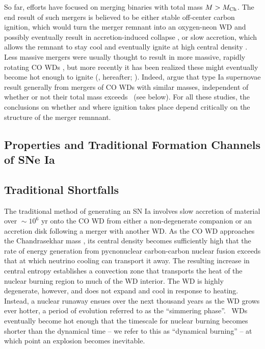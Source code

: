 So far, efforts have focused on merging binaries with total mass $M>\Mch$.  The end result of such mergers is believed to be either stable off-center carbon ignition, which would turn the merger remnant into an oxygen-neon WD and possibly eventually result in accretion-induced collapse \citep{saion98}, or slow accretion, which allows the remnant to stay cool and eventually ignite at high central density \citep{yoonpr07}.  Less massive mergers were usually thought to result in more massive, rapidly rotating CO WDs \citep{segrcm97,kube+10}, but more recently it has been realized these might eventually become hot enough to ignite (\citealt{vkercj10}, \citeal{vkercj10} hereafter; \citealt{shen+12,schw+12}).  Indeed, \citeal{vkercj10} argue that type Ia supernovae result generally from mergers of CO WDs with similar masses, independent of whether or not their total mass exceeds \Mch\ (see below).  For all these studies, the conclusions on whether and where ignition takes place depend critically on the structure of the merger remnnant.


\subsection{Properties and Traditional Formation Channels of SNe Ia}
\label{ssec:old_typeia}

\subsection{Traditional Shortfalls}

The traditional method of generating an SN Ia involves slow accretion of material over $\sim10^6$ yr onto the CO WD from either a non-degenerate companion or an accretion disk following a merger with another WD.  As the CO WD approaches the Chandrasekhar mass \Mch, its central density becomes sufficiently high that the rate of energy generation from pycnonuclear carbon-carbon nuclear fusion exceeds that at which neutrino cooling can transport it away.  The resulting increase in central entropy establishes a convection zone that transports the heat of the nuclear burning region to much of the WD interior.  The WD is highly degenerate, however, and does not expand and cool in response to heating.  Instead, a nuclear runaway ensues over the next thousand years as the WD grows ever hotter, a period of evolution referred to as the ``simmering phase''.  \Mch\ WDs eventually become hot enough that the timescale for nuclear burning becomes shorter than the dynamical time -- we refer to this as ``dynamical burning'' -- at which point an explosion becomes inevitable.

